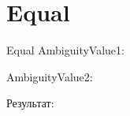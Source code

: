 \section{Equal}
\begin{frame}{Equal}
	AmbiguityValue1:


	AmbiguityValue2:


	Результат:
\end{frame}
